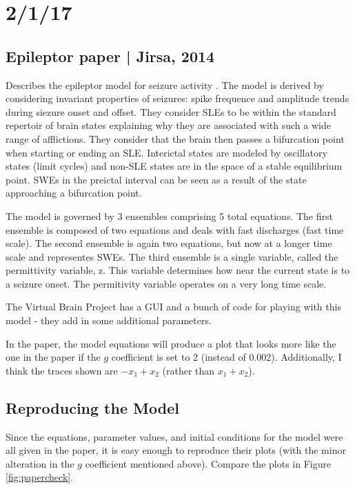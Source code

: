 \documentclass[11pt]{article}
\begin{document}
{\hypersetup{linkcolor=black}
\tableofcontents}

\section{2/1/17}
	\subsection{Epileptor paper | Jirsa, 2014}
	Describes the epileptor model for seizure activity \cite{Jirsa:2014aa}. The model is derived by considering invariant properties of seizures: spike frequence and amplitude trends during siezure onset and offset. They consider SLEs to be within the standard repertoir of brain states explaining why they are associated with such a wide range of afflictions. They consider that the brain then passes a bifurcation point when starting or ending an SLE. Interictal states are modeled by oscillatory states (limit cycles) and non-SLE states are in the space of a stable equilibrium point. SWEs in the preictal interval can be seen as a result of the state approaching a bifurcation point.

	The model is governed by 3 ensembles comprising 5 total equations. The first ensemble is composed of two equations and deals with fast discharges (fast time scale). The second ensemble is again two equations, but now at a longer time scale and representes SWEs. The third ensemble is a single variable, called the permittivity variable, z. This variable determines how near the current state is to a seizure onset. The permitivity variable operates on a very long time scale. 

	The Virtual Brain Project has a GUI and a bunch of code for playing with this model - they add in some additional parameters.

	In the paper, the model equations will produce a plot that looks more like the one in the paper if the $g$ coefficient is set to 2 (instead of 0.002). Additionally, I think the traces shown are $-x_1 + x_2$ (rather than $x_1 + x_2$).

	\subsection{Reproducing the Model}
	Since the equations, parameter values, and initial conditions for the model were all given in the paper, it is easy enough to reproduce their plots (with the minor alteration in the $g$ coefficient mentioned above). Compare the plots in Figure \ref{fig:papercheck}.
\end{document}
